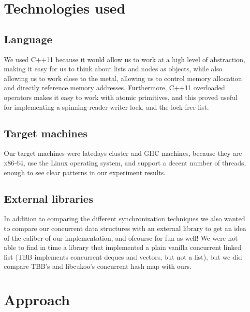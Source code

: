 \documentclass[11pt]{article}
\begin{document}
\section{Technologies used}
\subsection{Language}
We used C++11 because it would allow us to work at a high level of abstraction,
making it easy for us to think about lists and nodes as objects, while also
allowing us to work close to the metal, allowing us to control memory allocation
and directly reference memory addresses. Furthermore, C++11 overloaded operators
makes it easy to work with atomic primitives, and this proved useful for
implementing a spinning-reader-writer lock, and the lock-free list.

\subsection{Target machines}
Our target machines were latedays cluster and GHC machines, because they are
x86-64, use the Linux operating system, and support a decent number of threads,
enough to see clear patterns in our experiment results.


\subsection{External libraries}
In addition to comparing the different synchronization techniques we also wanted
to compare our concurrent data structures with an external library to get an
idea of the caliber of our implementation, and ofcourse for fun as well! We were
not able to find in time a library that implemented a plain vanilla concurrent
linked list (TBB implements concurrent deques and vectors, but not a list), but
we did compare TBB's and libcukoo's concurrent hash map with ours.


\section{Approach}
\end{document}
